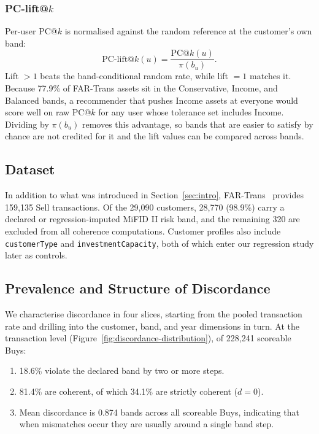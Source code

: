 \subsubsection{PC-lift@$k$}
Per-user PC@$k$ is normalised against the random reference at the customer's own band:
\begin{equation}
\text{PC-lift@}k(u) = \frac{\text{PC@}k(u)}{\pi(b_u)}.
\end{equation}
Lift $> 1$ beats the band-conditional random rate, while lift $= 1$ matches it. Because 77.9\% of FAR-Trans assets sit in the Conservative, Income, and Balanced bands, a recommender that pushes Income assets at everyone would score well on raw PC@$k$ for any user whose tolerance set includes Income. Dividing by $\pi(b_u)$ removes this advantage, so bands that are easier to satisfy by chance are not credited for it and the lift values can be compared across bands.

\subsection{Dataset}
\label{sec:setup:dataset}

In addition to what was introduced in Section~\ref{sec:intro}, FAR-Trans~\cite{sanzcruzado2024fartransinvestmentdatasetfinancial} provides 159{,}135 Sell transactions. Of the 29{,}090 customers, 28{,}770 (98.9\%) carry a declared or regression-imputed MiFID II risk band, and the remaining 320 are excluded from all coherence computations. Customer profiles also include \texttt{customerType} and \texttt{investmentCapacity}, both of which enter our regression study later as controls.

\subsection{Prevalence and Structure of Discordance}
\label{sec:rq1:prevalence}

We characterise discordance in four slices, starting from the pooled transaction rate and drilling into the customer, band, and year dimensions in turn. At the transaction level (Figure~\ref{fig:discordance-distribution}), of 228{,}241 scoreable Buys:
\begin{enumerate}
    \item 18.6\% violate the declared band by two or more steps.
    \item 81.4\% are coherent, of which 34.1\% are strictly coherent ($d = 0$).
    \item Mean discordance is 0.874 bands across all scoreable Buys, indicating that when mismatches occur they are usually around a single band step.
\end{enumerate}

